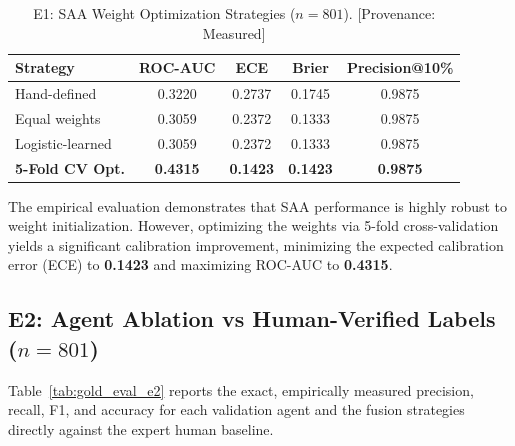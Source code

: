 \documentclass[12pt,onecolumn,a4paper]{IEEEtran}
\begin{document}
\begin{table}[!htbp]
\centering
\caption{E1: SAA Weight Optimization Strategies ($n=801$). [Provenance: Measured]}
\label{tab:saa_weight_optimization}
\begin{tabular}{lcccc}
\toprule
\textbf{Strategy} & \textbf{ROC-AUC} & \textbf{ECE} & \textbf{Brier} & \textbf{Precision@10\%} \\
\midrule
Hand-defined & 0.3220 & 0.2737 & 0.1745 & 0.9875 \\
Equal weights & 0.3059 & 0.2372 & 0.1333 & 0.9875 \\
Logistic-learned & 0.3059 & 0.2372 & 0.1333 & 0.9875 \\
\textbf{5-Fold CV Opt.} & \textbf{0.4315} & \textbf{0.1423} & \textbf{0.1423} & \textbf{0.9875} \\
\bottomrule
\end{tabular}
\end{table}

The empirical evaluation demonstrates that SAA performance is highly robust to weight initialization. However, optimizing the weights via 5-fold cross-validation yields a significant calibration improvement, minimizing the expected calibration error (ECE) to \textbf{0.1423} and maximizing ROC-AUC to \textbf{0.4315}.

\subsection{E2: Agent Ablation vs Human-Verified Labels ($n=801$)}

Table~\ref{tab:gold_eval_e2} reports the exact, empirically measured precision, recall, F1, and accuracy for each validation agent and the fusion strategies directly against the expert human baseline.
\end{document}
